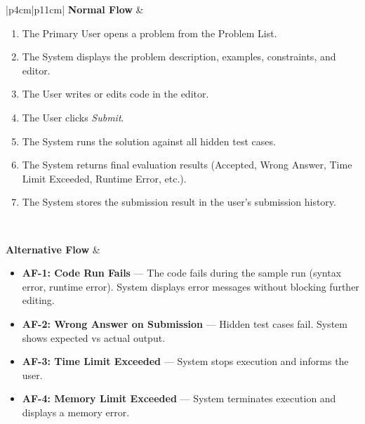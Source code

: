 \begin{table}[H]
\begin{tabular}{|p{4cm}|p{11cm}|}
\textbf{Normal Flow} &
\begin{minipage}[t]{\linewidth}
\begin{enumerate}[nosep, leftmargin=*]
\setlength\itemsep{0pt}
\setlength\topsep{0pt}
\setlength\partopsep{0pt}
\setlength\parsep{0pt}
    \item The Primary User opens a problem from the Problem List.
    \item The System displays the problem description, examples, constraints, and editor.
    \item The User writes or edits code in the editor.
    \item The User clicks \textit{Submit}.
    \item The System runs the solution against all hidden test cases.
    \item The System returns final evaluation results (Accepted, Wrong Answer, Time Limit Exceeded, Runtime Error, etc.).
    \item The System stores the submission result in the user’s submission history.
\end{enumerate}
\end{minipage}
\\ \hline

\textbf{Alternative Flow} &
\begin{minipage}[t]{\linewidth}
\begin{itemize}[nosep, leftmargin=*]
\setlength\itemsep{0pt}
\setlength\topsep{0pt}
\setlength\partopsep{0pt}
\setlength\parsep{0pt}
    \item \textbf{AF-1: Code Run Fails} — The code fails during the sample run (syntax error, runtime error). System displays error messages without blocking further editing.
    \item \textbf{AF-2: Wrong Answer on Submission} — Hidden test cases fail. System shows expected vs actual output.
    \item \textbf{AF-3: Time Limit Exceeded} — System stops execution and informs the user.
    \item \textbf{AF-4: Memory Limit Exceeded} — System terminates execution and displays a memory error.
\end{itemize}
\end{minipage}
\\ \hline


\end{tabular}
\end{table}
